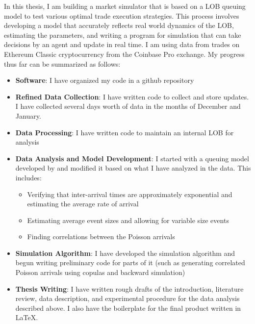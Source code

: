 In this thesis, I am building a market simulator that is based on a LOB queuing model to test various optimal trade execution strategies. This process involves developing a model that accurately reflects real world dynamics of the LOB, estimating the parameters, and writing a program for simulation that can take decisions by an agent and update in real time. I am using data from trades on Ethereum Classic cryptocurrency from the Coinbase Pro exchange. My progress thus far can be summarized as follows:

\begin{itemize}
\item \textbf{Software}: I have organized my code in a github repository
\item \textbf{Refined Data Collection}: I have written code to collect and store updates. I have collected several days worth of data in the months of December and January.
\item \textbf{Data Processing}: I have written code to maintain an internal LOB for analysis
\item \textbf{Data Analysis and Model Development}: I started with a queuing model developed by \cite{A6} and modified it based on what I have analyzed in the data. This includes:
    \begin{itemize}
    \item Verifying that inter-arrival times are approximately exponential and estimating the average rate of arrival
    \item Estimating average event sizes and allowing for variable size events
    \item Finding correlations between the Poisson arrivals
    \end{itemize}
\item \textbf{Simulation Algorithm}: I have developed the simulation algorithm and begun writing preliminary code for parts of it (such as generating correlated Poisson arrivals using copulas and backward simulation)
\item \textbf{Thesis Writing}: I have written rough drafts of the introduction, literature review, data description, and experimental procedure for the data analysis described above. I also have the boilerplate for the final product written in LaTeX.
\end{itemize}